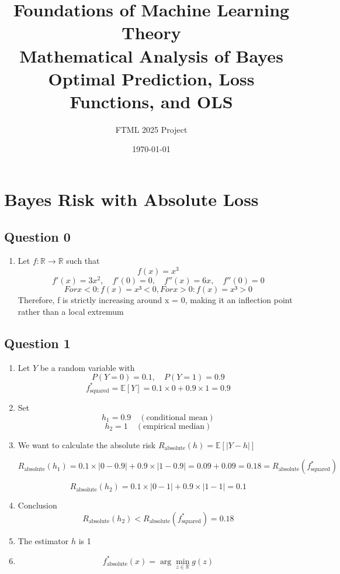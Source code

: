 \documentclass[11pt,a4paper]{article}
\title{\textbf{Foundations of Machine Learning Theory}\\
\large Mathematical Analysis of Bayes Optimal Prediction, Loss Functions, and OLS}
\author{FTML 2025 Project}
\date{\today}
\theoremstyle{definition}
\theoremstyle{remark}
\begin{document}
\section{Bayes Risk with Absolute Loss}
\subsection{Question 0}

\begin{enumerate}
  \item Let \( f : \mathbb{R} \to \mathbb{R} \) such that
  \[
    f(x) = x^3
  \]
  \[
    f'(x) = 3x^2, \quad f'(0) = 0, \quad f''(x) = 6x, \quad f''(0) = 0
  \]
  \[
    For x < 0: f(x) = x³ < 0, For x > 0: f(x) = x³ > 0
  \]
  Therefore, f is strictly increasing around x = 0, making it an inflection point rather than a
local extremum
\end{enumerate}

\subsection{Question 1}

\begin{enumerate}
  \item Let \(Y\) be a random variable with
  \[
    P(Y=0) = 0.1, \quad P(Y=1) = 0.9
  \]
  \[
    f^*_{\text{squared}} = \mathbb{E}[Y] = 0.1 \times 0 + 0.9 \times 1 = 0.9
  \]

  \item Set
  \[
    h_1 = 0.9 \quad (\text{conditional mean})
  \]
  \[
    h_2 = 1 \quad (\text{empirical median})
  \]

  \item We want to calculate the absolute risk \( R_{\text{absolute}}(h) = \mathbb{E}[|Y - h|] \)

  \[
    R_{\text{absolute}}(h_1) = 0.1 \times |0 - 0.9| + 0.9 \times |1 - 0.9| = 0.09 + 0.09 = 0.18 = R_{\text{absolute}}(f^*_{\text{squared}})
  \]

  \[
    R_{\text{absolute}}(h_2) = 0.1 \times |0 - 1| + 0.9 \times |1 - 1| = 0.1
  \]

  \item Conclusion
  \[
    R_{\text{absolute}}(h_2) < R_{\text{absolute}}(f^*_{\text{squared}}) = 0.18
  \]

  \item The estimator \( h \) is 1

  \item
  \[
    f^*_{\text{absolute}}(x) = \arg \min_{z \in \mathbb{R}} g(z)
  \]
\end{enumerate}
\end{document}

